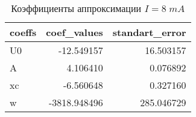 \begin{table}[h]
\centering
\caption{Коэффициенты аппроксимации $I=8\; mA$}
\label{coeffs_table}
\begin{tabular}{lrr}
\toprule
coeffs &  coef\_values &  standart\_error \\
\midrule
    U0 &   -12.549157 &       16.503157 \\
     A &     4.106410 &        0.076892 \\
    xc &    -6.560648 &        0.327160 \\
     w & -3818.948496 &      285.046729 \\
\bottomrule
\end{tabular}
\end{table}
